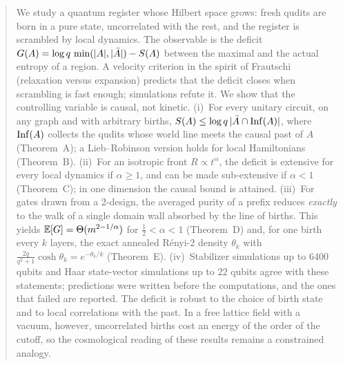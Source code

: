 \begin{abstract}
We study a quantum register whose Hilbert space grows: fresh qudits are born in a pure state, uncorrelated with the rest, and the register is scrambled by local dynamics. The observable is the deficit $G(A)=\log q\,\min(|A|,|\Abar|)-S(A)$ between the maximal and the actual entropy of a region. A velocity criterion in the spirit of Frautschi (relaxation versus expansion) predicts that the deficit closes when scrambling is fast enough; simulations refute it. We show that the controlling variable is causal, not kinetic.
(i)~For every unitary circuit, on any graph and with arbitrary births, $S(A)\le\log q\,|\Abar\cap\Inf(A)|$, where $\Inf(A)$ collects the qudits whose world line meets the causal past of $A$ (Theorem~A); a Lieb--Robinson version holds for local Hamiltonians (Theorem~B).
(ii)~For an isotropic front $R\propto t^\alpha$, the deficit is extensive for every local dynamics if $\alpha\ge1$, and can be made sub-extensive if $\alpha<1$ (Theorem~C); in one dimension the causal bound is attained.
(iii)~For gates drawn from a 2-design, the averaged purity of a prefix reduces \emph{exactly} to the walk of a single domain wall absorbed by the line of births. This yields $\E[G]=\Theta(m^{2-1/\alpha})$ for $\frac12<\alpha<1$ (Theorem~D) and, for one birth every $k$ layers, the exact annealed Rényi-2 density $\theta_k$ with $\frac{2q}{q^2+1}\cosh\theta_k=e^{-\theta_k/k}$ (Theorem~E).
(iv)~Stabilizer simulations up to $6400$ qubits and Haar state-vector simulations up to $22$ qubits agree with these statements; predictions were written before the computations, and the ones that failed are reported.
The deficit is robust to the choice of birth state and to local correlations with the past. In a free lattice field with a vacuum, however, uncorrelated births cost an energy of the order of the cutoff, so the cosmological reading of these results remains a constrained analogy.
\end{abstract}
